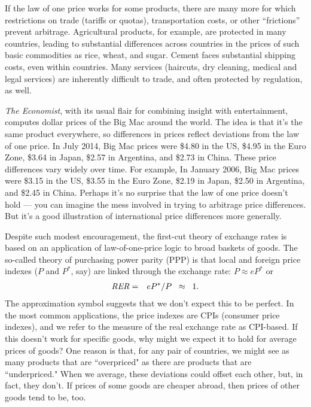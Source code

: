 If the law of one price works for some products,
there are many more for which restrictions on
trade (tariffs or quotas), transportation costs,
or other ``frictions'' prevent arbitrage.
Agricultural products, for example, are protected in many countries,
leading to substantial differences across countries
in the prices of such basic commodities as rice, wheat, and sugar.
Cement faces substantial shipping costs, even within countries.
Many services (haircuts, dry cleaning, medical and legal services)
are inherently difficult to trade,
and often protected by regulation, as well.

{\it The Economist\/}, with its usual flair for combining insight
with entertainment, computes dollar prices of the Big Mac around the
world.
The idea is that it's the same product everywhere, so differences
in prices reflect deviations from the law of one price.
In July 2014, Big Mac prices were \$4.80 in the US,
\$4.95 in the Euro Zone, \$3.64 in Japan, \$2.57 in Argentina,
and \$2.73 in China. These price differences vary
widely over time. For example, In January 2006, Big Mac prices  were \$3.15 in the US,
\$3.55 in the Euro Zone, \$2.19 in Japan, \$2.50 in Argentina,
and \$2.45 in China. Perhaps it's no surprise that the law of one price doesn't hold --- you can imagine the mess involved in trying to arbitrage price
differences.
But it's a good illustration of international price differences
more generally.


Despite such modest encouragement,
the first-cut theory of exchange rates is based on an application of
law-of-one-price logic to broad baskets of goods.
The so-called theory of purchasing power parity (PPP)
is that local and foreign price indexes ($P$ and $P^*$, say)
are linked through the exchange rate:  $ P \approx e P^* $ or
\begin{eqnarray}
    \mbox{\it RER\/} &=& eP^* /P \;\;\approx\;\; 1.
    \label{eq:ppp}
\end{eqnarray}
The approximation symbol suggests that we don't expect this to be perfect.
In the most common applications, the price indexes are CPIs
(consumer price indexes),
and we refer to the measure of the real exchange rate as CPI-based.
If this doesn't work for specific goods, why might we expect it to hold
for average prices of goods?
One reason is that, for any pair of countries,
we might see as many products that are ``overpriced"
as there are products that are ``underpriced."
When we average, these deviations could offset each other, but,
in fact, they don't. If prices of some goods are cheaper abroad, then prices
of other goods tend to be, too.

